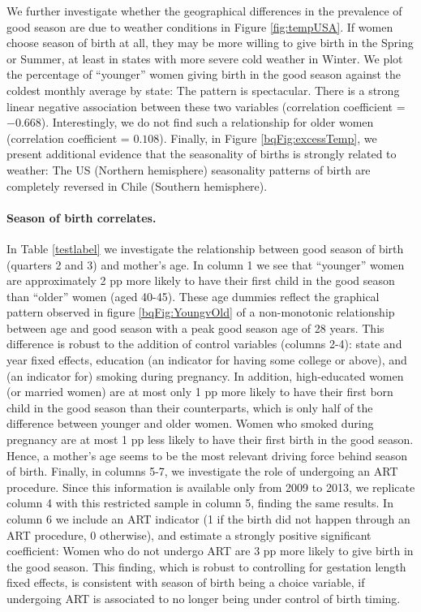 \documentclass[a4paper, 12 pt]{article}
\theoremstyle{plain}
\begin{document}
\begin{doublespace}
We further investigate whether the geographical differences in the prevalence of good season are due to weather conditions in Figure \ref{fig:tempUSA}. If women choose season of birth at all, they may be more willing to give birth in the Spring or Summer, at least in states with more severe cold weather in Winter. We plot the percentage of ``younger'' women giving birth in the good season against the coldest monthly average by state: The pattern is spectacular. There is a strong linear negative association between these two variables (correlation coefficient = $-0.668$). Interestingly, we do not find such a relationship for older women (correlation coefficient = $0.108$). Finally, in Figure \ref{bqFig:excessTemp}, we present additional evidence that the seasonality of births is strongly related to weather: The US (Northern hemisphere) seasonality patterns of birth are completely reversed in Chile (Southern hemisphere).


\paragraph{Season of birth correlates.} In Table \ref{testlabel} we investigate the relationship between good season of birth (quarters 2 and 3) and mother's age. In column 1 we see that ``younger'' women are approximately 2 pp more likely to have their first child in the good season than ``older'' women (aged 40-45). These age dummies reflect the graphical pattern observed in figure \ref{bqFig:YoungvOld} of a non-monotonic relationship between age and good season with a peak good season age of 28 years. This difference is robust to the addition of control variables (columns 2-4): state and year fixed effects, education (an indicator for having some college or above), and (an indicator for) smoking during pregnancy. In addition, high-educated women (or married women) are at most only 1 pp more likely to have their first born child in the good season than their counterparts, which is only half of the difference between younger and older women. Women who smoked during pregnancy are at most 1 pp less likely to have their first birth in the good season. Hence, a mother's age seems to be the most relevant driving force behind season of birth. Finally, in columns 5-7, we investigate the role of undergoing an ART procedure. Since this information is available only from 2009 to 2013, we replicate column 4 with this restricted sample in column 5, finding the same results. In column 6 we include an ART indicator (1 if the birth did not happen through an ART procedure, 0 otherwise), and estimate a strongly positive significant coefficient: Women who do not undergo ART are 3 pp more likely to give birth in the good season. This finding, which is robust to controlling for gestation length fixed effects, is consistent with season of birth being a choice variable, if undergoing ART is associated to no longer being under control of birth timing.%



\end{doublespace}
\end{document}
